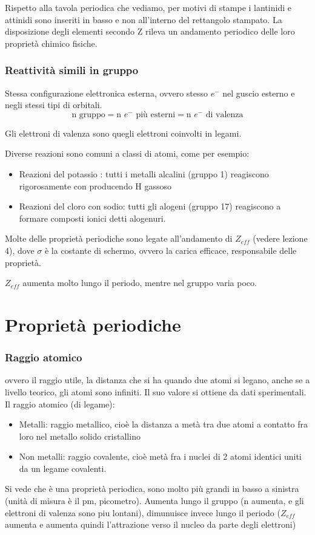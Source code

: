 Rispetto alla tavola periodica che vediamo, per motivi di stampe i lantinidi e attinidi sono inseriti in basso e non all'interno del rettangolo stampato. La disposizione degli elementi secondo Z rileva un andamento periodico delle loro proprietà chimico fisiche. 

\subsubsection{Reattività simili in gruppo}
Stessa configurazione elettronica esterna, ovvero stesso $e^{-}$ nel guscio esterno e negli stessi tipi di orbitali. \[\text{n gruppo} = \text{n $e^{-}$ più esterni} = \text{n $e^{-}$ di valenza}\]

Gli elettroni di valenza sono quegli elettroni coinvolti in legami. 

Diverse reazioni sono comuni a classi di atomi, come per esempio: 
\begin{itemize}
    \item Reazioni del potassio : tutti i metalli alcalini (gruppo 1) reagiscono rigorosamente con  producendo H gassoso
    \item Reazioni del cloro con sodio: tutti gli alogeni (gruppo 17) reagiscono a formare composti ionici detti alogenuri. 
\end{itemize}

Molte delle proprietà periodiche sono legate all'andamento di $Z_{eff}$ (vedere lezione 4), dove $\sigma$ è la costante di schermo, ovvero la carica efficace, responsabile delle proprietà. 


$Z_{eff}$ aumenta molto lungo il periodo, mentre nel gruppo varia poco. 

\section{Proprietà periodiche}
\subsubsection{Raggio atomico}
ovvero il raggio utile, la distanza che si ha quando due atomi si legano, anche se a livello teorico, gli atomi sono infiniti. 
    Il suo valore si ottiene da dati sperimentali.
    Il raggio atomico (di legame): 
    \begin{itemize}
        \item Metalli: raggio metallico, cioè la distanza a metà tra due atomi a contatto fra loro nel metallo solido cristallino
        \item Non metalli: raggio covalente, cioè metà fra i nuclei di 2 atomi identici uniti da un legame covalenti. 
    \end{itemize}
Si vede che è una proprietà periodica, sono molto più grandi in basso a sinistra (unità di misura è il pm, picometro). Aumenta lungo il gruppo (n aumenta, e gli elettroni di valenza sono piu lontani), dimunuisce invece lungo il periodo ($Z_{eff}$ aumenta e aumenta quindi l'attrazione verso il nucleo da parte degli elettroni)
